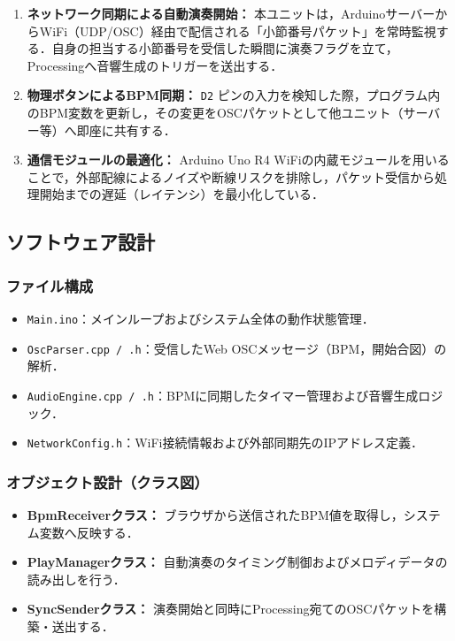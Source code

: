 \documentclass[uplatex,dvipdfmx]{jsarticle}
\begin{document}
\begin{enumerate}
    \item \textbf{ネットワーク同期による自動演奏開始：} 
    本ユニットは，ArduinoサーバーからWiFi（UDP/OSC）経由で配信される「小節番号パケット」を常時監視する．自身の担当する小節番号を受信した瞬間に演奏フラグを立て，Processingへ音響生成のトリガーを送出する．
    \item \textbf{物理ボタンによるBPM同期：} 
    \texttt{D2} ピンの入力を検知した際，プログラム内のBPM変数を更新し，その変更をOSCパケットとして他ユニット（サーバー等）へ即座に共有する．
    \item \textbf{通信モジュールの最適化：} 
    Arduino Uno R4 WiFiの内蔵モジュールを用いることで，外部配線によるノイズや断線リスクを排除し，パケット受信から処理開始までの遅延（レイテンシ）を最小化している．
\end{enumerate}
\subsection{\textbf{ソフトウェア設計}}

\subsubsection{\textbf{ファイル構成}}
\begin{itemize}
\item \texttt{Main.ino}：メインループおよびシステム全体の動作状態管理．
\item \texttt{OscParser.cpp / .h}：受信したWeb OSCメッセージ（BPM，開始合図）の解析．
\item \texttt{AudioEngine.cpp / .h}：BPMに同期したタイマー管理および音響生成ロジック．
\item \texttt{NetworkConfig.h}：WiFi接続情報および外部同期先のIPアドレス定義．
\end{itemize}

\subsubsection{\textbf{オブジェクト設計（クラス図）}}
\begin{itemize}
\item \textbf{BpmReceiverクラス：} ブラウザから送信されたBPM値を取得し，システム変数へ反映する．
\item \textbf{PlayManagerクラス：} 自動演奏のタイミング制御およびメロディデータの読み出しを行う．
\item \textbf{SyncSenderクラス：} 演奏開始と同時にProcessing宛てのOSCパケットを構築・送出する．
\end{itemize}
\end{document}

